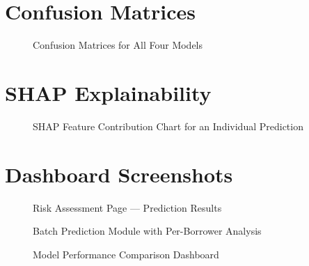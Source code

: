 \documentclass[12pt,a4paper]{report}
\begin{document}
\section{Confusion Matrices}

\begin{figure}[H]
\centering
{}
\caption{Confusion Matrices for All Four Models}
\label{fig:cm}
\end{figure}

\section{SHAP Explainability}

\begin{figure}[H]
\centering
{}
\caption{SHAP Feature Contribution Chart for an Individual Prediction}
\label{fig:shap}
\end{figure}

\section{Dashboard Screenshots}

\begin{figure}[H]
\centering
{}
\caption{Risk Assessment Page --- Prediction Results}
\label{fig:dashboard}
\end{figure}

\begin{figure}[H]
\centering
{}
\caption{Batch Prediction Module with Per-Borrower Analysis}
\label{fig:batch}
\end{figure}

\begin{figure}[H]
\centering
{}
\caption{Model Performance Comparison Dashboard}
\label{fig:perfbar}
\end{figure}
\end{document}

